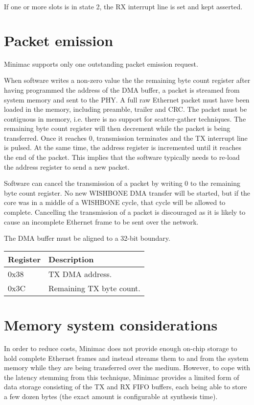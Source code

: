 \documentclass[a4paper,11pt]{article}
\begin{document}
If one or more slots is in state 2, the RX interrupt line is set and kept asserted.

\section{Packet emission}
Minimac supports only one outstanding packet emission request.

When software writes a non-zero value the the remaining byte count register after having programmed the address of the DMA buffer, a packet is streamed from system memory and sent to the PHY. A full raw Ethernet packet must have been loaded in the memory, including preamble, trailer and CRC. The packet must be contiguous in memory, i.e. there is no support for scatter-gather techniques. The remaining byte count register will then decrement while the packet is being transferred. Once it reaches 0, transmission terminates and the TX interrupt line is pulsed. At the same time, the address register is incremented until it reaches the end of the packet. This implies that the software typically needs to re-load the address register to send a new packet.

Software can cancel the transmission of a packet by writing 0 to the remaining byte count register. No new WISHBONE DMA transfer will be started, but if the core was in a middle of a WISHBONE cycle, that cycle will be allowed to complete. Cancelling the transmission of a packet is discouraged as it is likely to cause an incomplete Ethernet frame to be sent over the network.

The DMA buffer must be aligned to a 32-bit boundary.

\begin{tabularx}{450pt}{|l|X|}
\hline
\textbf{Register} & \textbf{Description} \\
\hline
0x38 & TX DMA address. \\
\hline
0x3C & Remaining TX byte count. \\
\hline
\end{tabularx}

\section{Memory system considerations}
In order to reduce costs, Minimac does not provide enough on-chip storage to hold complete Ethernet frames and instead streams them to and from the system memory while they are being transferred over the medium. However, to cope with the latency stemming from this technique, Minimac provides a limited form of data storage consisting of the TX and RX FIFO buffers, each being able to store a few dozen bytes (the exact amount is configurable at synthesis time).
\end{document}
